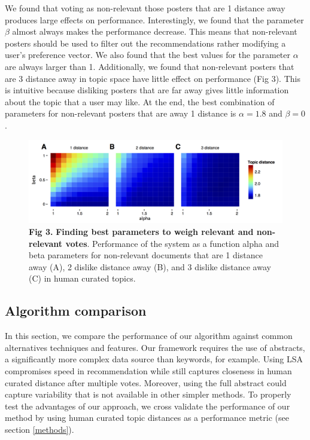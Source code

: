 \documentclass[a4paper]{article}
\begin{document}
We found that voting as non-relevant those posters that are 1 distance away produces large effects on performance. Interestingly, we found that the parameter $\beta$ almost always makes the performance decrease. This means that non-relevant posters should be used to filter out the recommendations rather modifying a user’s preference vector. We also found that the best values for the parameter $\alpha$ are always larger than 1. Additionally, we found that non-relevant posters that are 3 distance away in topic space have little effect on performance (Fig 3). This is intuitive because disliking posters that are far away gives little information about the topic that a user may like. At the end, the best combination of parameters for non-relevant posters that are away 1 distance is $\alpha=1.8$ and $\beta=0$.


\begin{figure}[!ht]
\centering
\includegraphics[width=5in]{alpha_beta_relation}
\caption*{\textbf{Fig 3.} \textbf{Finding best parameters to weigh relevant and non-relevant votes}. Performance of the system as a function alpha and beta parameters for non-relevant documents that are 1 distance away (A), 2 dislike distance away (B), and 3 dislike distance away (C) in human curated topics.}
\end{figure}

\subsection{Algorithm comparison}

In this section, we compare the performance of our algorithm against common alternatives techniques and features. Our framework requires the use of abstracts, a significantly more complex data source than keywords, for example. Using LSA compromises speed in recommendation while still captures closeness in human curated distance after multiple votes. Moreover, using the full abstract could capture variability that is not available in other simpler methods. To properly test the advantages of our approach, we cross validate the performance of our method by using human curated topic distances as a performance metric (see section \ref{methods}).
\end{document}
